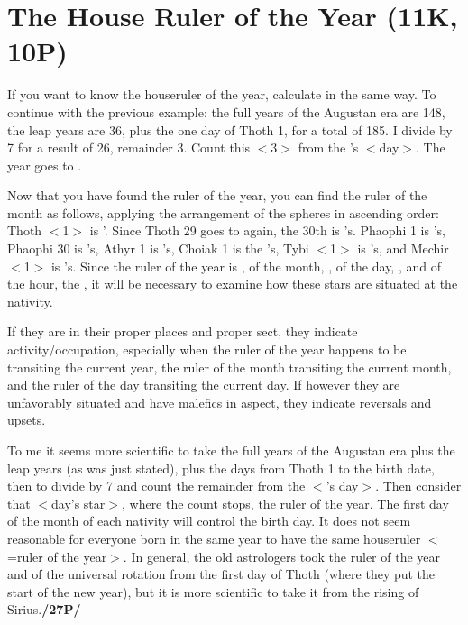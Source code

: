 \section{The House Ruler of the Year (11K, 10P)}

\mnm[0.3cm]
If you want to know the houseruler of the year, calculate in the same way. To continue with the previous example: the full years of the Augustan era are 148, the leap years are 36, plus the one day of Thoth 1, for a total of 185. I divide by 7 for a result of 26, remainder 3. Count this $<$3$>$ from the \Sun’s
$<$day$>$. The year goes to \Mars. 

Now that you have found the ruler of the year, you can find the ruler of the month as follows, applying the arrangement of the spheres in ascending order: Thoth $<$1$>$ is \Mars’. Since
Thoth 29 goes to \Mars\xspace again, the 30th is \Mercury’s. Phaophi 1 is \Jupiter’s, Phaophi 30 is \Venus’s, Athyr
1 is \Saturn’s, Choiak 1 is the \Moon’s, Tybi $<$1$>$ is \Mercury’s, and Mechir $<$1$>$ is \Venus’s. Since the
ruler of the year is \Mars, of the month, \Venus, of the day, \Mercury, and of the hour, the \Sun, it will be necessary to examine how these stars are situated at the nativity. 

\mndl[0.2cm]
If they are in their proper places and proper sect, they indicate activity/occupation, especially when the ruler of the year happens to be transiting the current year, the ruler of the month transiting the current month, and the ruler of the day transiting the current day. If however they are unfavorably situated and have malefics in aspect, they indicate reversals
and upsets.

To me it seems more scientific to take the full years of the Augustan era plus the leap years (as was just stated), plus the days from Thoth 1 to the birth date, then to divide by 7 and count the remainder from the \Sun$<$’s day$>$. Then consider that $<$day’s star$>$, where the count stops, the ruler of the year. The first day of the month of each nativity will control the birth day. It does not seem reasonable for everyone born in the same year to have the same houseruler $<$=ruler of the year$>$. In general, the old astrologers took the ruler of the year and of the universal rotation from the first day of Thoth (where they put the start of the new year), but it is more scientific to take it from the rising of Sirius.\textbf{/27P/}
\newpage